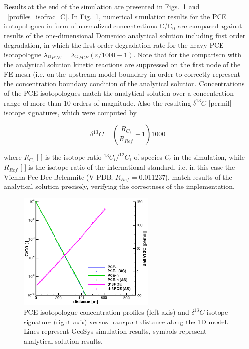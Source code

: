 Results at the end of the simulation are presented in Figs.~\ref{profiles_isofrac_C_AS} and ~\ref{profiles_isofrac_C}.
In Fig.~\ref{profiles_isofrac_C_AS}, numerical simulation results for the PCE isotopologues in form of normalized concentrations C/C$_0$ are compared against results of the one-dimensional Domenico analytical solution including first order degradation, in which the first order degradation rate for the heavy PCE isotopologue $\lambda_{^{13}PCE} = \lambda_{^{12}PCE}(\varepsilon/1000 -1)$. Note that for the comparison with the analytical solution kinetic reactions are suppressed on the first node of the FE mesh (i.e. on the upstream model boundary in order to correctly represent the concentration boundary condition of the analytical solution. Concentrations of the PCE isotopologues match the analytical solution over a concentration range of more than 10 orders of magnitude. Also the resulting $\delta^{13}C$ [permil] isotope signatures, which were computed by

\begin{equation}
    \delta^{13} C =  \left(
    \frac{R_{C_i}}{R_{Ref}} -1
    \right)1000
    \label{isotop_signature}
\end{equation}

where $R_{C_i}$ [-] is the isotope ratio $^{13}{C_i}/^{12}{C_i}$ of species $C_i$ in the simulation, while $R_{Ref}$  [-] is the isotope ratio of the international standard, i.e. in this case the Vienna Pee Dee Belemnite (V-PDB; $R_{Ref}$ = 0.011237), match results of the analytical solution precisely, verifying the correctness of the  implementation.

\begin{figure}[htbp]
\centering
\includegraphics[width=0.6\textwidth]{PART_III/HC/Fig_isofrac_AS.eps}
\caption{PCE isotopologue concentration profiles (left axis) and $\delta^{13}C$ isotope signature (right axis) versus transport distance along the 1D model. Lines represent GeoSys simulation results, symbols represent analytical solution results.}
\label{profiles_isofrac_C_AS}
\end{figure}

